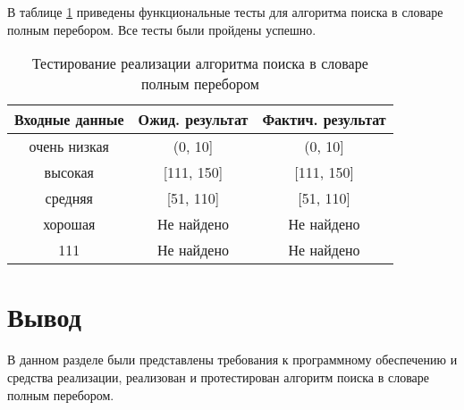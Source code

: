 В таблице \ref{table:test} приведены функциональные тесты для алгоритма поиска в словаре полным перебором. Все тесты были пройдены успешно.

\begin{center}
	\captionsetup{justification=raggedright,singlelinecheck=off}
	\begin{table}[ht]
		\centering
		\caption{Тестирование реализации алгоритма поиска в словаре полным перебором}
		\label{table:test}
		\begin{tabular}{ |c|c|c|}
			\hline
			Входные данные    & Ожид. результат   	  & Фактич. результат    \\ 
			\hline
			очень низкая			  & (0, 10]   & (0, 10] \\ \hline
			высокая 			  & [111, 150]    & [111, 150] \\ \hline
			средняя 		  & [51, 110] & [51, 110] \\ \hline
			хорошая & Не найдено & Не найдено \\ \hline
			111 & Не найдено & Не найдено \\ \hline
		\end{tabular}
	\end{table}
\end{center}
\captionsetup{singlelinecheck = false, justification=centering}

\section*{Вывод}
В данном разделе были представлены требования к программному обеспечению и средства реализации, реализован и протестирован алгоритм поиска в словаре полным перебором.

